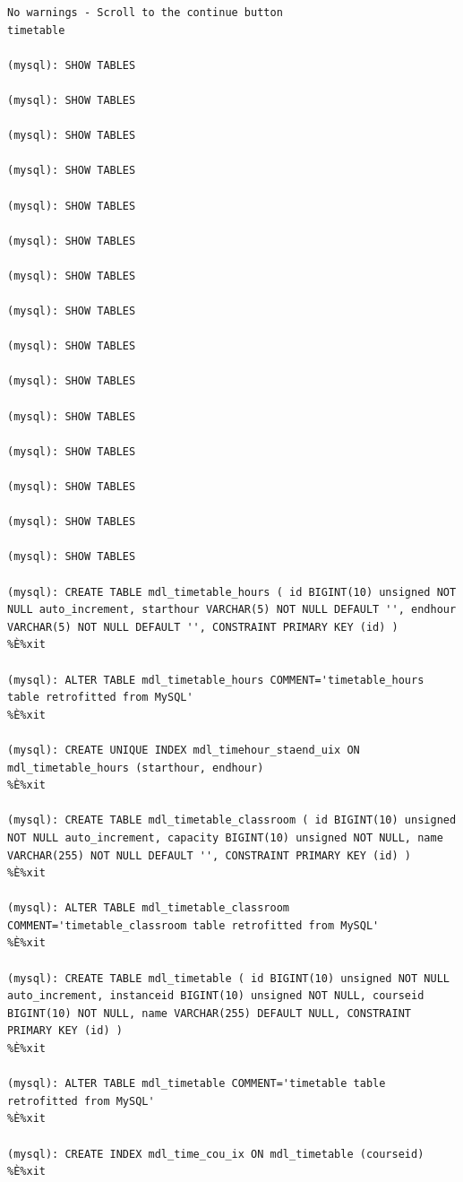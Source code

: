 \documentclass[a4paper]{report}  %
\begin{document}
\begin{lstlisting}[style=SQL, caption=Resultat de la insta\l.lació del Block dins al sistema Moodle,escapechar=\%]
No warnings - Scroll to the continue button
timetable

(mysql): SHOW TABLES

(mysql): SHOW TABLES

(mysql): SHOW TABLES

(mysql): SHOW TABLES

(mysql): SHOW TABLES

(mysql): SHOW TABLES

(mysql): SHOW TABLES

(mysql): SHOW TABLES

(mysql): SHOW TABLES

(mysql): SHOW TABLES

(mysql): SHOW TABLES

(mysql): SHOW TABLES

(mysql): SHOW TABLES

(mysql): SHOW TABLES

(mysql): SHOW TABLES

(mysql): CREATE TABLE mdl_timetable_hours ( id BIGINT(10) unsigned NOT NULL auto_increment, starthour VARCHAR(5) NOT NULL DEFAULT '', endhour VARCHAR(5) NOT NULL DEFAULT '', CONSTRAINT PRIMARY KEY (id) )
%È%xit 

(mysql): ALTER TABLE mdl_timetable_hours COMMENT='timetable_hours table retrofitted from MySQL'
%È%xit

(mysql): CREATE UNIQUE INDEX mdl_timehour_staend_uix ON mdl_timetable_hours (starthour, endhour)
%È%xit

(mysql): CREATE TABLE mdl_timetable_classroom ( id BIGINT(10) unsigned NOT NULL auto_increment, capacity BIGINT(10) unsigned NOT NULL, name VARCHAR(255) NOT NULL DEFAULT '', CONSTRAINT PRIMARY KEY (id) )
%È%xit

(mysql): ALTER TABLE mdl_timetable_classroom COMMENT='timetable_classroom table retrofitted from MySQL'
%È%xit

(mysql): CREATE TABLE mdl_timetable ( id BIGINT(10) unsigned NOT NULL auto_increment, instanceid BIGINT(10) unsigned NOT NULL, courseid BIGINT(10) NOT NULL, name VARCHAR(255) DEFAULT NULL, CONSTRAINT PRIMARY KEY (id) )
%È%xit

(mysql): ALTER TABLE mdl_timetable COMMENT='timetable table retrofitted from MySQL'
%È%xit

(mysql): CREATE INDEX mdl_time_cou_ix ON mdl_timetable (courseid)
%È%xit


\end{lstlisting}
\end{document}
